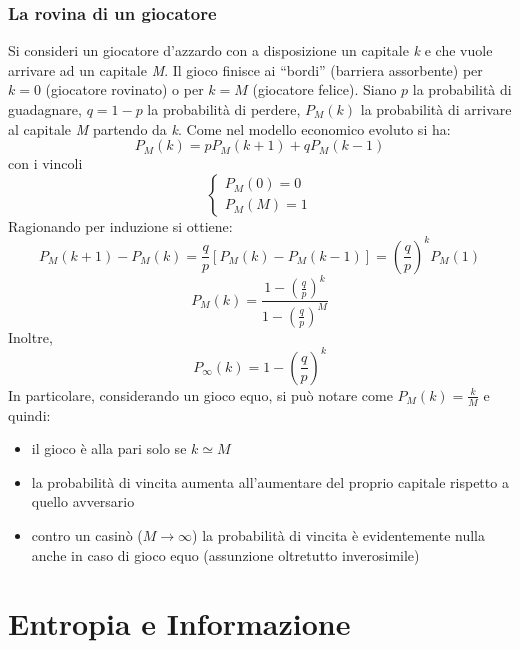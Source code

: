 \documentclass[12pt, a4paper]{book}
\theoremstyle{theorem}
\begin{document}
			\subsection{La rovina di un giocatore}
				Si consideri un giocatore d'azzardo con a disposizione un capitale \textit{k} e che vuole arrivare ad un capitale \textit{M}.
				Il gioco finisce ai ``bordi'' (barriera assorbente) per $k=0$ (giocatore rovinato) o per $k=M$ (giocatore felice).
				Siano $p$ la probabilità di guadagnare, $q=1-p$ la probabilità di perdere, $P_M(k)$ la probabilità di arrivare al capitale \textit{M} partendo da \textit{k}.
				Come nel modello economico evoluto si ha:
				\begin{equation*}
					P_M(k)=pP_M(k+1)+qP_M(k-1)
				\end{equation*}
				con i vincoli
				\begin{equation*}
					\begin{cases}
						P_M(0)=0\\
						P_M(M)=1
					\end{cases}
				\end{equation*}
				Ragionando per induzione si ottiene:
				\begin{equation*}
					P_M(k+1)-P_M(k)=\frac{q}{p}\left[P_M(k)-P_M(k-1)\right]=\left(\frac{q}{p}\right)^kP_M(1)
				\end{equation*}
				\begin{equation}
					P_M(k)=\frac{1-\left(\frac{q}{p}\right)^k}{1-\left(\frac{q}{p}\right)^M}
				\end{equation}
				Inoltre,
				\begin{equation}
					P_\infty(k)=1-\left(\frac{q}{p}\right)^k
				\end{equation}
				In particolare, considerando un gioco equo, si può notare come $P_M(k)=\frac{k}{M}$ e quindi:
				\begin{itemize}
					\item il gioco è alla pari solo se $k\simeq M$
					\item la probabilità di vincita aumenta all'aumentare del proprio capitale rispetto a quello avversario
					\item contro un casinò ($M\to\infty$) la probabilità di vincita è evidentemente nulla anche in caso di gioco equo (assunzione oltretutto inverosimile)
				\end{itemize}
	
	\chapter{Entropia e Informazione} %
\end{document}

